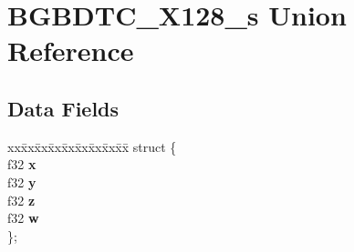 \hypertarget{unionBGBDTC__X128__s}{\section{B\-G\-B\-D\-T\-C\-\_\-\-X128\-\_\-s Union Reference}
\label{unionBGBDTC__X128__s}
}
\subsection*{Data Fields}
\begin{DoxyCompactItemize}
\item 
\hypertarget{unionBGBDTC__X128__s_aff8d1242eaefd07ed786ee6a351a903b}{\begin{tabbing}
xx\=xx\=xx\=xx\=xx\=xx\=xx\=xx\=xx\=\kill
struct \{\\
\hypertarget{structBGBDTC__X128__s_1_1@18_a9f6c4b36b57f81f8a528f783609235ac}{\>u32 {\bfseries a}\\
\hypertarget{structBGBDTC__X128__s_1_1@18_a47ef64749844efe18d4b874f5b7a0e32}{\>u32 {\bfseries b}\\
\hypertarget{structBGBDTC__X128__s_1_1@18_a055e7b4cbfb8e6e17614597a3fb4f185}{\>u32 {\bfseries c}\\
\hypertarget{structBGBDTC__X128__s_1_1@18_a47ac759012e29033e6a49d23a14d215b}{\>u32 {\bfseries d}\\
\}; }\label{unionBGBDTC__X128__s_aff8d1242eaefd07ed786ee6a351a903b}
\\

\end{tabbing}\item 
\hypertarget{unionBGBDTC__X128__s_aa9e5d55750d57c292e4b090db8ff1a00}{\begin{tabbing}
xx\=xx\=xx\=xx\=xx\=xx\=xx\=xx\=xx\=\kill
struct \{\\
\hypertarget{structBGBDTC__X128__s_1_1@20_a027f99999cb60aaecceddfef4426e106}{\>f32 {\bfseries x}\\
\hypertarget{structBGBDTC__X128__s_1_1@20_a54df2cbfcef3f3918fa7fe52a522b968}{\>f32 {\bfseries y}\\
\hypertarget{structBGBDTC__X128__s_1_1@20_a40d14dea5cb45ca530a2f67e0c8da064}{\>f32 {\bfseries z}\\
\hypertarget{structBGBDTC__X128__s_1_1@20_adc3ac3b77d892e3eeef075d44768a0e0}{\>f32 {\bfseries w}\\
\}; }\label{unionBGBDTC__X128__s_aa9e5d55750d57c292e4b090db8ff1a00}
\\

}}}
\end{tabbing}}}
\end{DoxyCompactItemize}
